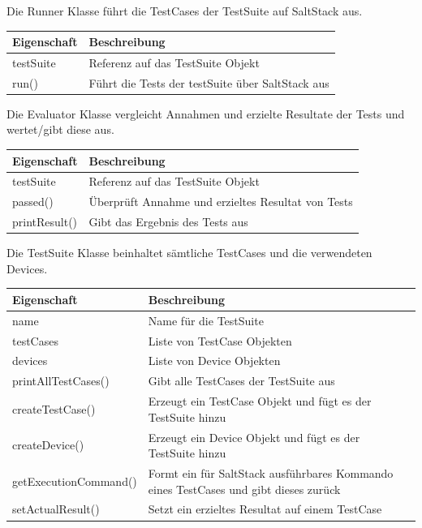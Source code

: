 \documentclass[a4,12pt]{scrartcl}
\begin{document}
Die Runner Klasse führt die TestCases der TestSuite auf SaltStack aus.
\noindent \begin{table}[H]
\centering
    \begin{tabular}{@{}l p{12cm} @{}}\toprule    
    {Eigenschaft} & {Beschreibung}\\ \midrule      
    testSuite & Referenz auf das TestSuite Objekt \\
    run() & Führt die Tests der testSuite über SaltStack aus\\
    \bottomrule
    \end{tabular}
\end{table}

Die Evaluator Klasse vergleicht Annahmen und erzielte Resultate der Tests und wertet/gibt diese aus.
\noindent \begin{table}[H]
\centering
    \begin{tabular}{@{}l p{12cm} @{}}\toprule    
    {Eigenschaft} & {Beschreibung}\\ \midrule      
    testSuite & Referenz auf das TestSuite Objekt \\
    passed() & Überprüft Annahme und erzieltes Resultat von Tests\\
    printResult() & Gibt das Ergebnis des Tests aus
    \bottomrule
    \end{tabular}
\end{table}

Die TestSuite Klasse beinhaltet sämtliche TestCases und die verwendeten Devices.
\noindent \begin{table}[H]
\centering
    \begin{tabular}{@{}l p{12cm} @{}}\toprule    
    {Eigenschaft} & {Beschreibung}\\ \midrule      
    name & Name für die TestSuite \\
    testCases & Liste von TestCase Objekten\\
    devices & Liste von Device Objekten\\
    printAllTestCases() & Gibt alle TestCases der TestSuite aus\\
    createTestCase() & Erzeugt ein TestCase Objekt und fügt es der TestSuite hinzu\\
    createDevice() & Erzeugt ein Device Objekt und fügt es der TestSuite hinzu\\
    getExecutionCommand() & Formt ein für SaltStack ausführbares Kommando eines TestCases und gibt dieses zurück\\
    setActualResult() & Setzt ein erzieltes Resultat auf einem TestCase\\
    \bottomrule
    \end{tabular}
\end{table}
\end{document}
